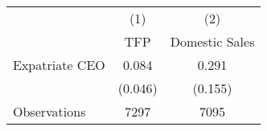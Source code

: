 {
\def\sym#1{\ifmmode^{#1}\else\(^{#1}\)\fi}
\begin{tabular}{l*{2}{c}}
\hline\hline
                    &\multicolumn{1}{c}{(1)}&\multicolumn{1}{c}{(2)}\\
                    &\multicolumn{1}{c}{TFP}&\multicolumn{1}{c}{Domestic Sales}\\
\hline
Expatriate CEO      &       0.084         &       0.291         \\
                    &     (0.046)         &     (0.155)         \\
\hline
Observations        &        7297         &        7095         \\
\hline\hline
\end{tabular}
}
